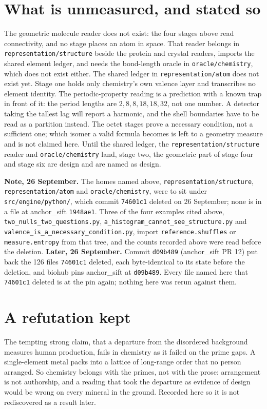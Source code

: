 \section*{What is unmeasured, and stated so}

The geometric molecule reader does not exist: the four stages above read connectivity, and no stage
places an atom in space. That reader belongs in \texttt{representation/structure} beside the protein
and crystal readers, imports the shared element ledger, and needs the bond-length oracle in
\texttt{oracle/chemistry}, which does not exist either. The shared ledger in
\texttt{representation/atom} does not exist yet. Stage one holds only chemistry's own valence layer
and transcribes no element identity. The periodic-property reading is a prediction with a known trap
in front of it: the period lengths are \(2, 8, 8, 18, 18, 32\), not one number. A detector taking the
tallest lag will report a harmonic, and the shell boundaries have to be read as a partition instead.
The octet stages prove a necessary condition, not a sufficient one; which isomer a valid formula
becomes is left to a geometry measure and is not claimed here. Until the shared ledger, the
\texttt{representation/structure} reader and \texttt{oracle/chemistry} land, stage two, the geometric
part of stage four and stage six are design and are named as design.

\textbf{Note, 26 September.} The homes named above, \texttt{representation/structure},
\texttt{representation/atom} and \texttt{oracle/chemistry}, were to sit under
\texttt{src/engine/python/}, which commit \texttt{74601c1} deleted on 26 September; none is in a file
at anchor\_sift \texttt{1948ae1}. Three of the four examples cited above,
\texttt{two\_nulls\_two\_questions.py}, \texttt{a\_histogram\_cannot\_see\_structure.py} and
\texttt{valence\_is\_a\_necessary\_condition.py}, import \texttt{reference.shuffles} or
\texttt{measure.entropy} from that tree, and the counts recorded above were read before the deletion.
\textbf{Later, 26 September.} Commit \texttt{d09b489} (anchor\_sift PR 12) put back the 126 files
\texttt{74601c1} deleted, each byte-identical to its state before the deletion, and biohub pins
anchor\_sift at \texttt{d09b489}. Every file named here that \texttt{74601c1} deleted is at the pin
again; nothing here was rerun against them.

\section*{A refutation kept}

The tempting strong claim, that a departure from the disordered background measures human production,
fails in chemistry as it failed on the prime gaps. A single-element metal packs into a lattice of
long-range order that no person arranged. So chemistry belongs with the primes, not with the prose:
arrangement is not authorship, and a reading that took the departure as evidence of design would be
wrong on every mineral in the ground. Recorded here so it is not rediscovered as a result later.
